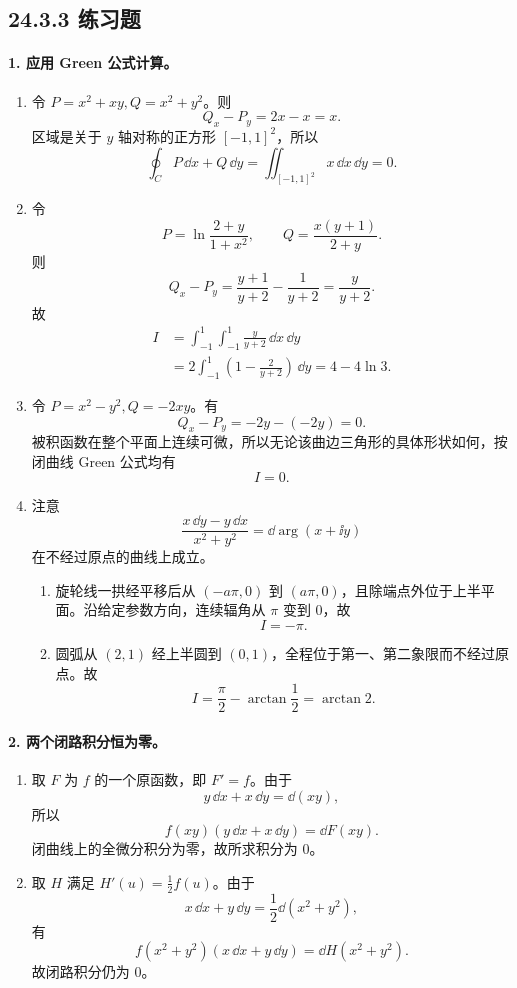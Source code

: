 \subsection*{24.3.3 练习题}

\paragraph{1. 应用 Green 公式计算。}
\begin{xsolution}
\begin{enumerate}[label=(\arabic*)]
\item 令 $P=x^2+xy,Q=x^2+y^2$。则
\[
  Q_x-P_y=2x-x=x.
\]
区域是关于 $y$ 轴对称的正方形 $[-1,1]^2$，所以
\[
  \oint_C P\,\dd x+Q\,\dd y
  =\iint_{[-1,1]^2}x\,\dd x\,\dd y=0.
\]

\item 令
\[
  P=\ln\frac{2+y}{1+x^2},
  \qquad
  Q=\frac{x(y+1)}{2+y}.
\]
则
\[
  Q_x-P_y=\frac{y+1}{y+2}-\frac1{y+2}=\frac y{y+2}.
\]
故
\begin{align*}
  I
  &=\int_{-1}^1\int_{-1}^1\frac y{y+2}\,\dd x\,\dd y\\
  &=2\int_{-1}^1\left(1-\frac2{y+2}\right)\,\dd y
   =4-4\ln3.
\end{align*}

\item 令 $P=x^2-y^2,Q=-2xy$。有
\[
  Q_x-P_y=-2y-(-2y)=0.
\]
被积函数在整个平面上连续可微，所以无论该曲边三角形的具体形状如何，按闭曲线 Green 公式均有
\[
  I=0.
\]

\item 注意
\[
  \frac{x\,\dd y-y\,\dd x}{x^2+y^2}=\dd\arg(x+\ii y)
\]
在不经过原点的曲线上成立。
\begin{enumerate}[label=(\alph*)]
\item 旋轮线一拱经平移后从 $(-a\pi,0)$ 到 $(a\pi,0)$，且除端点外位于上半平面。沿给定参数方向，连续辐角从 $\pi$ 变到 $0$，故
\[
  I=-\pi.
\]
\item 圆弧从 $(2,1)$ 经上半圆到 $(0,1)$，全程位于第一、第二象限而不经过原点。故
\[
  I=\frac\pi2-\arctan\frac12=\arctan2.
\]
\end{enumerate}
\end{enumerate}
\end{xsolution}

\paragraph{2. 两个闭路积分恒为零。}
\begin{xsolution}
\begin{enumerate}[label=(\arabic*)]
\item 取 $F$ 为 $f$ 的一个原函数，即 $F'=f$。由于
\[
  y\,\dd x+x\,\dd y=\dd(xy),
\]
所以
\[
  f(xy)(y\,\dd x+x\,\dd y)=\dd F(xy).
\]
闭曲线上的全微分积分为零，故所求积分为 $0$。

\item 取 $H$ 满足 $H'(u)=\frac12f(u)$。由于
\[
  x\,\dd x+y\,\dd y=\frac12\dd(x^2+y^2),
\]
有
\[
  f(x^2+y^2)(x\,\dd x+y\,\dd y)
  =\dd H(x^2+y^2).
\]
故闭路积分仍为 $0$。
\end{enumerate}
\end{xsolution}

